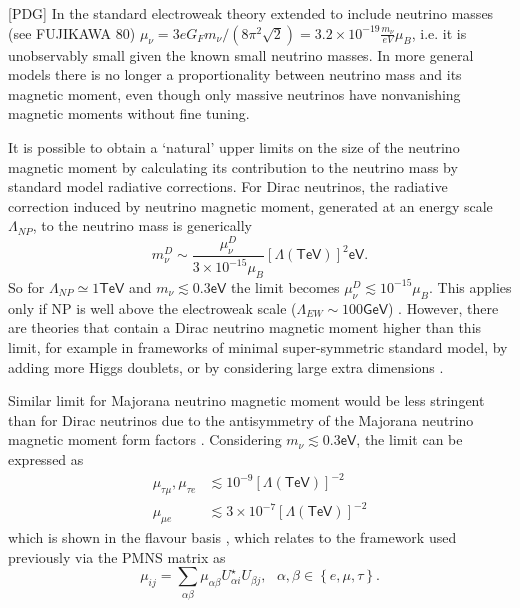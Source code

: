 [PDG]  In the standard electroweak theory extended to include neutrino masses (see FUJIKAWA 80) $\mu_\nu=3eG_Fm_\nu/\left(8\pi^2\sqrt{2}\right)=3.2\times10^{-19}\frac{m_\nu}{\unit{eV}}\mu_B$, i.e. it is unobservably small given the known small neutrino masses. In more general models there is no longer a proportionality between neutrino mass and its magnetic moment, even though only massive neutrinos have nonvanishing magnetic moments without fine tuning.

It is possible \cite{nuMMMajoranaBounds2006.pdf} to obtain a `natural' upper limits on the size of the neutrino magnetic moment by calculating its contribution to the neutrino mass by standard model radiative corrections.  For Dirac neutrinos, the radiative correction induced by neutrino magnetic moment, generated at an energy scale $\Lambda_{NP}$, to the neutrino mass is generically
\begin{equation}
m_{\nu}^D\sim\frac{\mu_{\nu}^D}{3\times 10^{-15}\mu_B}\left[\Lambda\left(\textsf{TeV}\right)\right]^2\textsf{eV}.
\end{equation}
So for $\Lambda_{NP}\simeq 1\textsf{TeV}$ and $m_{\nu}\lesssim 0.3\textsf{eV}$ the limit becomes $\mu_{\nu}^D\lesssim 10^{-15}\mu_B$. This applies only if \gls{NP} is well above the electroweak scale ($\Lambda_{EW} \sim 100\textsf{GeV}$) . However, there are theories that contain a Dirac neutrino magnetic moment higher than this limit, for example in frameworks of minimal super-symmetric standard model, by adding more Higgs doublets, or by considering large extra dimensions  \cite{nuElmagInt2015.pdf}.

Similar limit for Majorana neutrino magnetic moment would be less stringent than for Dirac neutrinos due to the antisymmetry of the Majorana neutrino magnetic moment form factors . Considering $m_{\nu}\lesssim 0.3\textsf{eV}$, the limit can be expressed as 
\begin{align}
\mu_{\tau\mu},\mu_{\tau e} &\lesssim 10^{-9}\left[\Lambda\left(\textsf{TeV}\right)\right]^{-2}\\
\mu_{\mu e} &\lesssim 3\times 10^{-7}\left[\Lambda\left(\textsf{TeV}\right)\right]^{-2}
\end{align}
which is shown in the flavour basis , which relates to the framework used previously via the \gls{PMNS} matrix as
\begin{equation}
\mu_{ij}=\sum_{\alpha\beta}\mu_{\alpha\beta}U^{\star}_{\alpha i}U_{\beta j},\ \ \ \alpha,\beta\in\left\lbrace e,\mu,\tau\right\rbrace.
\end{equation}

